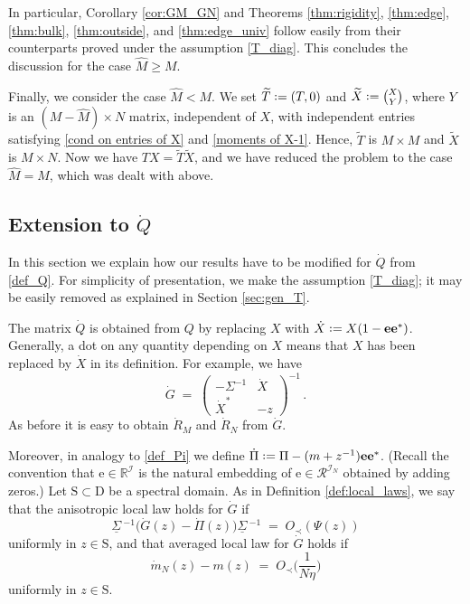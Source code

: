\documentclass[11pt]{article} %
\numberwithin{equation}{section}
\numberwithin{figure}{section}
\theoremstyle{plain} %
\theoremstyle{definition} %
\newcommand{\f}[1]{\boldsymbol{\mathrm{#1}}} %
\renewcommand{\cal}{\mathcal}
\newcommand{\ul}[1]{\underline{#1} \!\,} %
\newcommand{\wh}{\widehat}
\newcommand{\wt}{\widetilde}
\newcommand{\R}{\mathbb{R}}
\newcommand*{\deq}{\mathrel{\vcenter{\baselineskip0.65ex \lineskiplimit0pt \hbox{.}\hbox{.}}}=}
\renewcommand{\geq}{\geqslant}
\newcommand{\pb}[1]{\bigl({#1}\bigr)}
\newcommand{\pbb}[1]{\biggl({#1}\biggr)}
\begin{document}
In particular, Corollary \ref{cor:GM_GN} and Theorems \ref{thm:rigidity}, \ref{thm:edge}, \ref{thm:bulk}, \ref{thm:outside}, and \ref{thm:edge_univ} follow easily from their counterparts proved under the assumption \eqref{T_diag}. This concludes the discussion for the case $\wh M \geq M$.


Finally, we consider the case $\wh M < M$. We set $\wt T \deq (T, 0)$ and $\wt X \deq \binom{X}{Y}$, 
where $Y$ is an $(M - \wh M) \times N$ matrix, independent of $X$, with independent entries satisfying \eqref{cond on entries of X} and \eqref{moments of X-1}. Hence, $\wt T$ is $M \times M$ and $\wt X$ is $M \times N$. Now we have $TX = \wt T \wt X$, and we have reduced the problem to the case $\wh M = M$, which was dealt with above.

\subsection{Extension to $\dot Q$} \label{sec:Q_dot}
In this section we explain how our results have to be modified for $\dot Q$ from \eqref{def_Q}. For simplicity of presentation, we make the assumption \eqref{T_diag}; it may be easily removed as explained in Section \ref{sec:gen_T}.

The matrix $\dot Q$ is obtained from $Q$ by replacing $X$ with $\dot X \deq X (1 - \f e \f e^*)$. Generally, a dot on any quantity depending on $X$ means that $X$ has been replaced by $\dot X$ in its definition. For example, we have
\begin{equation*}
\dot G \;=\; \begin{pmatrix}
-\Sigma^{-1} & \dot X
\\
\dot X^* & -z
\end{pmatrix}^{-1}\,.
\end{equation*}
As before it is easy to obtain $\dot R_M$ and $\dot R_N$ from $\dot G$.

Moreover, in analogy to \eqref{def_Pi} we define
$
\dot \Pi \deq \Pi -  (m + z^{-1}) \f e \f e^*$.
(Recall the convention that $\f e \in \R^{\cal I}$ is the natural embedding of $\f e \in \cal R^{\cal I_N}$ obtained by adding zeros.)
Let $\f S \subset \f D$ be a spectral domain.
As in Definition \ref{def:local_laws}, we say that the anisotropic local law holds for $\dot G$ if
\begin{equation} \label{isotropic law dot}
\ul \Sigma^{-1} \pb{\dot G(z) - \dot \Pi(z)} \ul \Sigma^{-1} \;=\; O_\prec(\Psi(z))
\end{equation}
uniformly in $z \in \f S$, and that averaged local law for $\dot G$ holds if
\begin{equation} \label{averaged law dot}
\dot m_N(z) - m(z) \;=\; O_\prec \pbb{\frac{1}{N \eta}}
\end{equation}
uniformly in $z \in \f S$.
\end{document}
